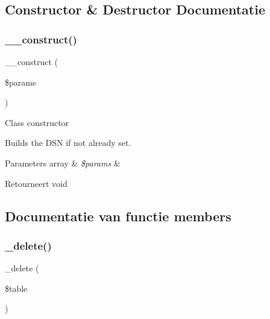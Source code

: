 \subsection{Constructor \& Destructor Documentatie}
\mbox{\label{class_c_i___d_b__pdo__pgsql__driver_a9162320adff1a1a4afd7f2372f753a3e}} 
\subsubsection{\texorpdfstring{\_\_construct()}{\_\_construct()}}
{\footnotesize\ttfamily \+\_\+\+\_\+construct (\begin{DoxyParamCaption}\item[{}]{\$params }\end{DoxyParamCaption})}

Class constructor

Builds the D\+SN if not already set.


\begin{DoxyParams}[1]{Parameters}
array & {\em \$params} & \\
\hline
\end{DoxyParams}
\begin{DoxyReturn}{Retourneert}
void 
\end{DoxyReturn}


\subsection{Documentatie van functie members}
\mbox{\label{class_c_i___d_b__pdo__pgsql__driver_a133ea8446ded52589bd22cc9163d0896}} 
\subsubsection{\texorpdfstring{\_delete()}{\_delete()}}
{\footnotesize\ttfamily \+\_\+delete (\begin{DoxyParamCaption}\item[{}]{\$table }\end{DoxyParamCaption})\hspace{0.3cm}{\ttfamily [protected]}}

